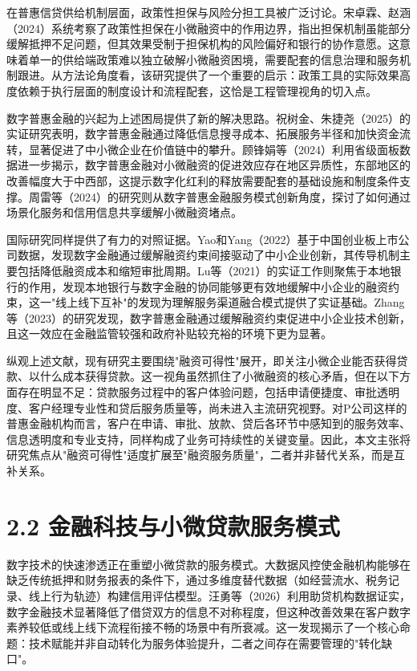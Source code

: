 在普惠信贷供给机制层面，政策性担保与风险分担工具被广泛讨论。宋卓霖、赵涵（2024）系统考察了政策性担保在小微融资中的作用边界，指出担保机制虽能部分缓解抵押不足问题，但其效果受制于担保机构的风险偏好和银行的协作意愿\cite{ref18}。这意味着单一的供给端政策难以独立破解小微融资困境，需要配套的信息治理和服务机制跟进。从方法论角度看，该研究提供了一个重要的启示：政策工具的实际效果高度依赖于执行层面的制度设计和流程配套，这恰是工程管理视角的切入点。\par

数字普惠金融的兴起为上述困局提供了新的解决思路。祝树金、朱捷尧（2025）的实证研究表明，数字普惠金融通过降低信息搜寻成本、拓展服务半径和加快资金流转，显著促进了中小微企业在价值链中的攀升\cite{ref7}。顾锋娟等（2024）利用省级面板数据进一步揭示，数字普惠金融对小微融资的促进效应存在地区异质性，东部地区的改善幅度大于中西部，这提示数字化红利的释放需要配套的基础设施和制度条件支撑\cite{ref21}。周雷等（2024）的研究则从数字普惠金融服务模式创新角度，探讨了如何通过场景化服务和信用信息共享缓解小微融资堵点\cite{ref22}。\par

国际研究同样提供了有力的对照证据。Yao和Yang（2022）基于中国创业板上市公司数据，发现数字金融通过缓解融资约束间接驱动了中小企业创新，其传导机制主要包括降低融资成本和缩短审批周期\cite{ref6}。Lu等（2021）的实证工作则聚焦于本地银行的作用，发现本地银行与数字金融的协同能够更有效地缓解中小企业的融资约束，这一"线上线下互补"的发现为理解服务渠道融合模式提供了实证基础\cite{ref13}。Zhang等（2023）的研究发现，数字普惠金融通过缓解融资约束促进中小企业技术创新，且这一效应在金融监管较强和政府补贴较充裕的环境下更为显著\cite{ref23}。\par

纵观上述文献，现有研究主要围绕"融资可得性"展开，即关注小微企业能否获得贷款、以什么成本获得贷款。这一视角虽然抓住了小微融资的核心矛盾，但在以下方面存在明显不足：贷款服务过程中的客户体验问题，包括申请便捷度、审批透明度、客户经理专业性和贷后服务质量等，尚未进入主流研究视野。对P公司这样的普惠金融机构而言，客户在申请、审批、放款、贷后各环节中感知到的服务效率、信息透明度和专业支持，同样构成了业务可持续性的关键变量。因此，本文主张将研究焦点从"融资可得性"适度扩展至"融资服务质量"，二者并非替代关系，而是互补关系。\par

\section{2.2 金融科技与小微贷款服务模式}

数字技术的快速渗透正在重塑小微贷款的服务模式。大数据风控使金融机构能够在缺乏传统抵押和财务报表的条件下，通过多维度替代数据（如经营流水、税务记录、线上行为轨迹）构建信用评估模型\cite{ref10}。汪勇等（2026）利用助贷机构数据证实，数字金融技术显著降低了借贷双方的信息不对称程度，但这种改善效果在客户数字素养较低或线上线下流程衔接不畅的场景中有所衰减\cite{ref10}。这一发现揭示了一个核心命题：技术赋能并非自动转化为服务体验提升，二者之间存在需要管理的"转化缺口"。\par

